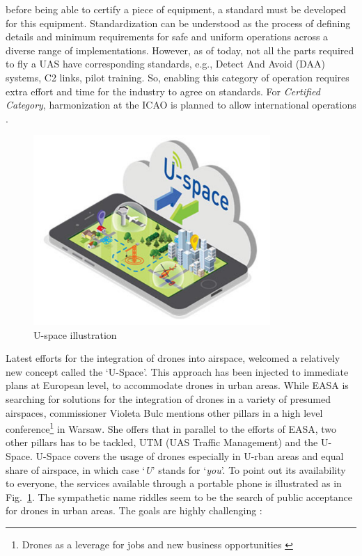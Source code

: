 \begin{itemize}
{before being able to certify a piece of equipment, a standard must be developed for this equipment. 
Standardization can be understood as the process of defining details and minimum requirements for safe and uniform operations across a diverse range of implementations. 
However, as of today, not all the parts required to fly a UAS have corresponding standards, e.g., Detect And Avoid (DAA) systems, C2 links, pilot training. 
So, enabling this category of operation requires extra effort and time for the industry to agree on standards. 
For \emph{Certified Category}, harmonization at the ICAO is planned to allow international operations \cite{manfredi2018unmanned}.}
\end{itemize}

\begin{figure}
\begin{center}
\includegraphics[width=9cm]{figures/USpacePortable}    %
\caption{U-space illustration \cite{UTMairspace}} 
\label{fig:USpacePortable}
\end{center}
\end{figure}

Latest efforts for the integration of drones into airspace, welcomed a relatively new concept called the `U-Space'. 
This approach has been injected to immediate plans at European level, to accommodate drones in urban areas. 
While EASA is searching for solutions for the integration of drones in a variety of presumed airspaces, commissioner Violeta Bulc mentions other pillars in a high level conference\footnote{Drones as a leverage for jobs and new business opportunities \cite{warsawDeclaration}} in Warsaw. 
She offers that in parallel to the efforts of EASA, two other pillars has to be tackled, UTM (UAS Traffic Management) and the U-Space.
U-Space covers the usage of drones especially in U-rban areas and equal share of airspace, in which case `\emph{U}' stands for `\emph{you}'.
To point out its availability to everyone, the services available through a portable phone is illustrated as in Fig.~\ref{fig:USpacePortable}.
The sympathetic name riddles seem to be the search of public acceptance for drones in urban areas.
The goals are highly challenging \cite{UTMairspace}:

